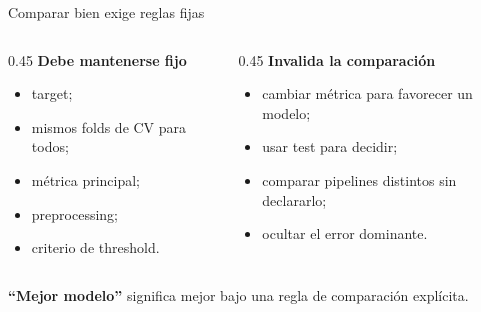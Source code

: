 \documentclass[aspectratio=169,12pt]{beamer}
\newcommand{\colhead}[1]{\textbf{#1}\par\vspace{2pt}}
\begin{document}
\begin{frame}{Comparar bien exige reglas fijas}
  \begin{columns}[T]
    \begin{column}{0.45\textwidth}
      \colhead{Debe mantenerse fijo}
      \begin{itemize}
        \item target;
        \item mismos folds de CV para todos;
        \item métrica principal;
        \item preprocessing;
        \item criterio de threshold.
      \end{itemize}
    \end{column}
    \begin{column}{0.45\textwidth}
      \colhead{Invalida la comparación}
      \begin{itemize}
        \item cambiar métrica para favorecer un modelo;
        \item usar test para decidir;
        \item comparar pipelines distintos sin declararlo;
        \item ocultar el error dominante.
      \end{itemize}
    \end{column}
  \end{columns}
  \vspace{6pt}
  \begin{center}
    \Large\textbf{``Mejor modelo''} significa mejor bajo una regla de comparación explícita.
  \end{center}
\end{frame}
\end{document}
